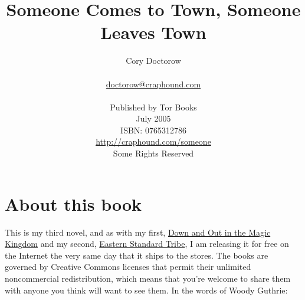 %
%
%
%
%



\newcommand{\lettrine}[3][none]{#2#3}



\title{\Huge Someone Comes to Town, Someone Leaves Town}
\author
{
	{\Large Cory Doctorow} \\ \\
	\href{mailto:doctorow@craphound.com}{doctorow@craphound.com} \\ \\
	Published by Tor Books \\
	July 2005 \\
	ISBN:  0765312786 \\
	\href{http://craphound.com/someone}{http://craphound.com/someone} \\
	Some Rights Reserved \\
}
\date{}
\maketitle
\thispagestyle{empty}

\newpage



\section{About this book}
This is my third novel, and as with my first, 
\href{http://craphound.com/down}{Down and Out in the Magic Kingdom}
and my second, \href{http://craphound.com/est}{Eastern Standard
Tribe}, I am releasing it for free on the Internet the very same
day that it ships to the stores.  The books are governed by Creative
Commons licenses that permit their unlimited noncommercial
redistribution, which means that you're welcome to share them with
anyone you think will want to see them.  In the words of Woody
Guthrie: 

